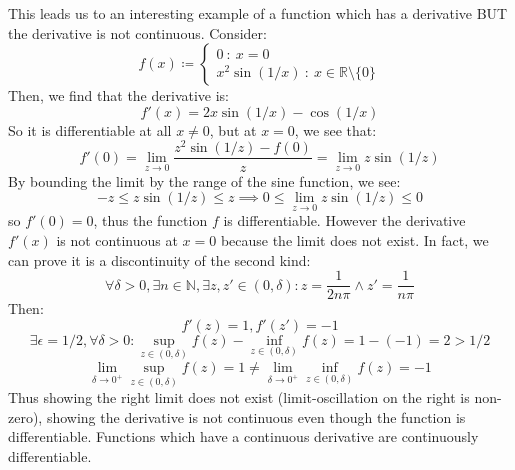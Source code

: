 \documentclass[10pt,letterpaper]{article} %
\begin{document}
This leads us to an interesting example of a function which has a derivative BUT the derivative is not continuous. Consider:
\begin{equation*}
f(x) \coloneq \begin{cases*}
  0 \ : \ x = 0\\
  x^2\sin(1/x) \ : \ x \in \mathbb{R}\setminus \{0\}
\end{cases*}
\end{equation*}
Then, we find that the derivative is:
\begin{equation*}
f'(x) = 2x\sin(1/x) - \cos(1/x)
\end{equation*}
So it is differentiable at all $x \neq 0$, but at $x=0$, we see that:
\begin{equation*}
f'(0) = \lim_{z \xrightarrow{} 0}\frac{z^2\sin(1/z) - f(0)}{z} = \lim_{z \xrightarrow{} 0}z\sin(1/z)
\end{equation*}
By bounding the limit by the range of the sine function, we see:
\begin{equation*}
-z \leqslant z\sin(1/z) \leqslant z \implies 0 \leqslant \lim_{z \xrightarrow{} 0}z\sin(1/z) \leqslant 0
\end{equation*}
so $f'(0) = 0$, thus the function $f$ is differentiable. However the derivative $f'(x)$ is not continuous at $x = 0$ because the limit does not exist. In fact, we can prove it is a discontinuity of the second kind:
\begin{equation*}
\forall \delta > 0, \exists n \in \mathbb{N}, \exists z, z' \in (0, \delta): z = \frac{1}{2n\pi} \land z' = \frac{1}{n\pi} 
\end{equation*}
Then:
\begin{equation*}
f'(z) = 1, f'(z') = -1
\end{equation*}
\begin{equation*}
\exists \epsilon = 1/2, \forall \delta > 0: \sup_{z \in (0, \delta)}f(z) - \inf_{z \in (0, \delta)}f(z) = 1 - (-1) = 2 > 1/2
\end{equation*}
\begin{equation*}
\lim_{\delta \xrightarrow{} 0^+}\sup_{z \in (0, \delta)}f(z) = 1 \neq \lim_{\delta \xrightarrow{} 0^+}\inf_{z \in (0, \delta)}f(z) = -1
\end{equation*}
Thus showing the right limit does not exist (limit-oscillation on the right is non-zero), showing the derivative is not continuous even though the function is differentiable. Functions which have a continuous derivative are continuously differentiable.
\end{document}
